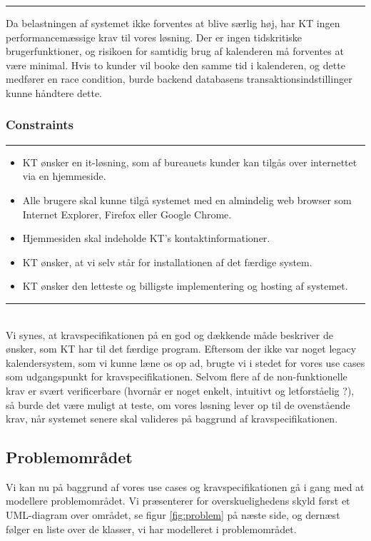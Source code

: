 \documentclass[12pt]{article}   %
\begin{document}
\rule{120mm}{1mm}
\vspace{0.5cm}

Da belastningen af systemet ikke forventes at blive særlig høj, har KT ingen performancemæssige krav til vores løsning. Der er ingen tidskritiske brugerfunktioner, og risikoen for samtidig brug af kalenderen må forventes at være minimal. Hvis to kunder vil booke den samme 
tid i kalenderen, og dette medfører en race condition, burde backend databasens transaktionsindstillinger kunne håndtere dette.\\


\subsubsection{Constraints}
\rule{120mm}{1mm}
\begin{itemize}
\item KT ønsker en it-løsning, som af bureauets kunder kan tilgås over internettet via en hjemmeside.
\item Alle brugere skal kunne tilgå systemet med en almindelig web browser som Internet Explorer, Firefox eller Google Chrome.
\item Hjemmesiden skal indeholde KT's kontaktinformationer.
\item KT ønsker, at vi selv står for installationen af det færdige system.
\item KT ønsker den letteste og billigste implementering og hosting af systemet.
\end{itemize}
\rule{120mm}{1mm}\\

Vi synes, at kravspecifikationen på en god og dækkende måde beskriver de ønsker, som KT har til det færdige program. Eftersom der ikke var noget legacy kalendersystem, som vi kunne læne os op ad, brugte vi i stedet for vores use cases som udgangspunkt for kravspecifikationen. Selvom flere af de non-funktionelle krav er svært verificerbare (hvornår er noget enkelt, intuitivt og letforståelig ?), så burde det være muligt at teste, om vores løsning lever op til de ovenstående krav, når systemet senere skal valideres på baggrund af kravspecifikationen.  

\subsection{Problemområdet}

Vi kan nu på baggrund af vores use cases og kravspecifikationen gå i gang med at modellere problemområdet. Vi præsenterer for overskuelighedens skyld først et UML-diagram over området, se figur \ref{fig:problem} på næste side, og dernæst følger en liste over de klasser, vi har modelleret i problemområdet.
\end{document}
